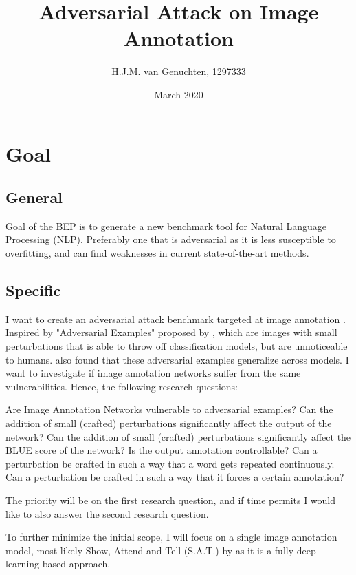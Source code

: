 \documentclass[12pt]{extarticle}
\title{Adversarial Attack on Image Annotation}
\author{H.J.M. van Genuchten, 1297333}
\date{March 2020}
\begin{document}
\maketitle

\section{ Goal}
\subsection{General}
Goal of the BEP is to generate a new benchmark tool for Natural Language Processing (NLP). Preferably one that is adversarial as it is less susceptible to overfitting, and can find weaknesses in current state-of-the-art methods.

\subsection{Specific}
I want to create an adversarial attack benchmark targeted at image annotation \cite{xu2016show,venkatesh}. Inspired by "Adversarial Examples" proposed by \citeauthor{szegedy2014intriguing}, which are images with small perturbations that is able to throw off classification models, but are unnoticeable to humans. \citeauthor{szegedy2014intriguing} also found that these adversarial examples generalize across models. I want to investigate if image annotation networks suffer from the same vulnerabilities. Hence, the following research questions:
\begin{outline}
    \1 Are Image Annotation Networks vulnerable to adversarial examples?
    \2 Can the addition of small (crafted) perturbations significantly affect the output of the network?
    \2 Can the addition of small (crafted) perturbations significantly affect the BLUE\cite{papineni_roukos_ward_zhu_2001} score of the network?
    \1 Is the output annotation controllable?
    \2 Can a perturbation be crafted in such a way that a word gets repeated continuously.
    \2 Can a perturbation be crafted in such a way that it forces a certain annotation?
\end{outline}
The priority will be on the first research question, and if time permits I would like to also answer the second research question.

To further minimize the initial scope, I will focus on a single image annotation model, most likely Show, Attend and Tell (S.A.T.) by \citeauthor{xu2016show} as it is a fully deep learning based approach.
\end{document}
